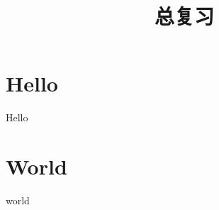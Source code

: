 \documentclass[12pt]{article}
\begin{document}
	
	\begin{CJK*}{UTF8}{gbsn}
		
		\title{总复习}
		
		\maketitle
		
		\tableofcontents
		
		\thispagestyle{empty}
		
		\newpage
		
		\setcounter{page}{1}
		\section{Hello}
		Hello
		\section{World}
		world
		
		
	\end{CJK*}
	
\end{document}
